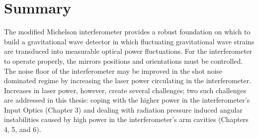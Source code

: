 
\section{Summary}
The modified Michelson interferometer provides a robust foundation on
which to build a gravitational wave detector in which fluctuating
gravitational wave strains are transduced into measurable optical
power fluctuations.  For the interferometer to operate properly, the
mirrors positions and orientations must be controlled.  The noise
floor of the interferometer may be improved in the shot noise
dominated regime by increasing the laser power circulating in the
interferometer.  Increases in laser power, however, create several
challenges; two such challenges are addressed in this thesis: coping
with the higher power in the interferometer's Input Optics (Chapter 3)
and dealing with radiation pressure induced angular instabilities
caused by high power in the interferometer's arm cavities (Chapters 4,
5, and 6).
